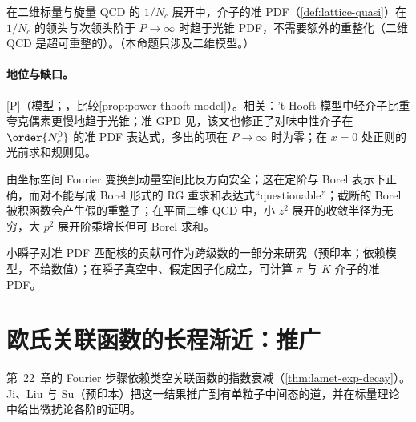 \begin{proposition}\label{prop:yzliu-2dqcd}
在二维标量与旋量 QCD 的 $1/N_c$ 展开中，介子的准 PDF（\cref{def:lattice-quasi}）在 $1/N_c$ 的领头与次领头阶于 $P\to\infty$ 时趋于光锥 PDF，不需要额外的重整化（二维 QCD 是超可重整的）。（本命题只涉及二维模型。）
\end{proposition}

\paragraph{地位与缺口。}[P]（模型；\cite{Ji:2018waw}，比较\cref{prop:power-thooft-model}）。相关：'t Hooft 模型中轻介子比重夸克偶素更慢地趋于光锥\cite{Jia:2018qee}；准 GPD 见\cite{Jia:2024atq}，该文也修正了\cite{Jia:2018qee}对味中性介子在 $\order{N_c^0}$ 的准 PDF 表达式，多出的项在 $P\to\infty$ 时为零；在 $x=0$ 处正则的光前求和规则见\cite{Ji:2020bby}。

\begin{remark}[坐标空间与动量空间之间变换的教训]\label{rem:yzliu-transforms}
由坐标空间 Fourier 变换到动量空间比反方向安全；这在定阶与 Borel 表示下正确，而对不能写成 Borel 形式的 RG 重求和表达式“questionable”；截断的 Borel 被积函数会产生假的重整子；在平面二维 QCD 中，小 $z^2$ 展开的收敛半径为无穷，大 $p^2$ 展开阶乘增长但可 Borel 求和\cite[第~6~节]{Liu:2024omb}。
\end{remark}

\begin{remark}[瞬子与模型研究]\label{rem:yzliu-instantons}
小瞬子对准 PDF 匹配核的贡献可作为跨级数的一部分来研究\cite{Liu:2021evw}（预印本；依赖模型，不给数值）；在瞬子真空中、假定因子化成立，可计算 $\pi$ 与 $K$ 介子的准 PDF\cite{Kock:2020frx}。
\end{remark}

\section{欧氏关联函数的长程渐近：推广}\label{sec:yzliu-decay}

第~22~章的 Fourier 步骤依赖类空关联函数的指数衰减（\cref{thm:lamet-exp-decay}）。Ji、Liu 与 Su\cite{Ji:2026vir}（预印本）把这一结果推广到有单粒子中间态的道，并在标量理论中给出微扰论各阶的证明。

